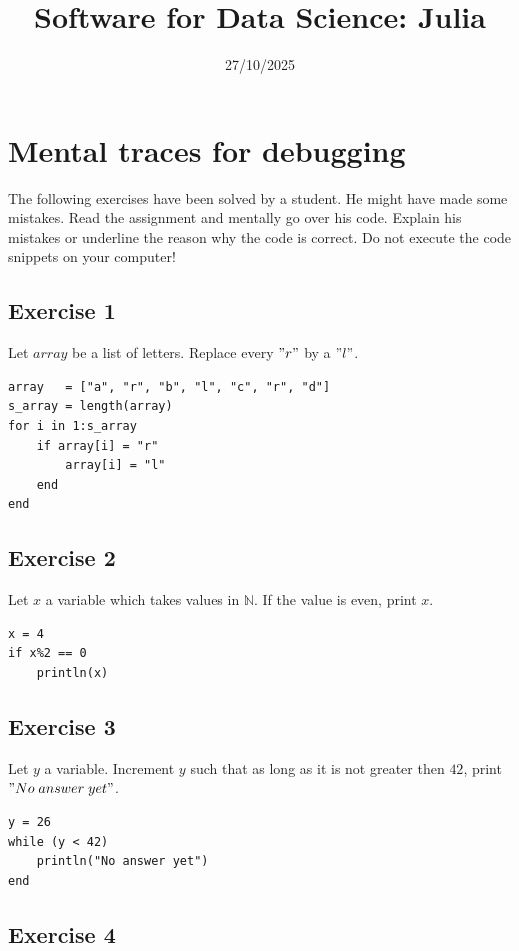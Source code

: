 \documentclass{article}
\title{Software for Data Science: Julia}
\date{27/10/2025}
\begin{document}
\maketitle
\section*{Mental traces for debugging}

The following exercises have been solved by a student. He might have made some mistakes. Read the assignment and mentally go over his code. Explain his mistakes or underline the reason why the code is correct. Do not execute the code snippets on your computer!

\subsection*{Exercise 1}

Let $array$ be a list of letters. Replace every $"r"$ by a $"l"$.

\begin{verbatim}
array   = ["a", "r", "b", "l", "c", "r", "d"]
s_array = length(array)
for i in 1:s_array
    if array[i] = "r"
        array[i] = "l"
    end
end
\end{verbatim}

\subsection*{Exercise 2}

Let $x$ a variable which takes values in $\mathbb{N}$. If the value is even, print $x$.

\begin{verbatim}
x = 4
if x%2 == 0
    println(x)
\end{verbatim}

\subsection*{Exercise 3}

Let $y$ a variable. Increment $y$ such that as long as it is not greater then $42$, print $"No \; answer \; yet"$. 

\begin{verbatim}
y = 26
while (y < 42)
    println("No answer yet")
end
\end{verbatim}

\subsection*{Exercise 4}
\end{document}
